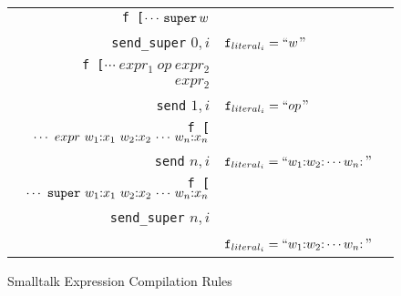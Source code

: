 \documentclass[11pt]{article}
\begin{document}
\begin{figure}
\begin{center}
\begin{tabular}[t]{r | l | l }
{\tt f\,[}$\cdots \,{\tt super} \,w$ &
\begin{minipage}[t]{0.25\linewidth}
$expr$\\
{\tt send\_super} $0,i$\vspace{5pt}
\end{minipage}  & $\text{\tt f}_{literal_i} = ``w$'' \\

{\tt f\,[}$\cdots ~expr_1~ op~ expr_2$ &
\begin{minipage}[t]{0.25\linewidth}
$expr_1$\\
$expr_2$\\
{\tt send} $1,i$\vspace{5pt}
\end{minipage}  & $\text{\tt f}_{literal_i} = ``op$'' \\

{\tt f\,[}$\cdots ~expr ~w_1{\tt :} x_1 ~ w_2{\tt :} x_2 \, \cdots \, w_n{\tt :} x_n$ &
\begin{minipage}[t]{0.25\linewidth}
$expr$\\
{\tt send} $n,i$\vspace{5pt}
\end{minipage}  & $\text{\tt f}_{literal_i} = ``w_1{\tt :}w_2{\tt :}\cdots w_n{\tt :}$'' \\

{\tt f\,[}$\cdots ~{\tt super} ~w_1{\tt :} x_1 ~ w_2{\tt :} x_2 \, \cdots \, w_n{\tt :} x_n$ &
\begin{minipage}[t]{0.25\linewidth}
$expr$\\
{\tt send\_super} $n,i$\\
\end{minipage}  & $\text{\tt f}_{literal_i} = ``w_1{\tt :}w_2{\tt :}\cdots w_n{\tt :}$'' \\

\end{tabular}
\end{center}
\vspace{-10pt}
\caption{Smalltalk Expression Compilation Rules}
\label{default}
\end{figure}%

\begin{minipage}[t]{0.25\linewidth}
\end{minipage} 

\begin{minipage}[t]{0.25\linewidth}
\begin{alltt}
\end{alltt}
\end{minipage} 
\end{document}
